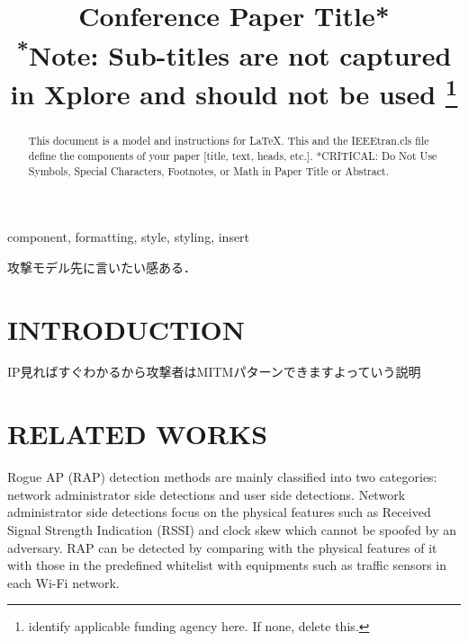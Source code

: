 \documentclass[conference]{IEEEtran}
\begin{document}
\title{Conference Paper Title*\\
{\footnotesize \textsuperscript{*}Note: Sub-titles are not captured in Xplore and
should not be used}
\thanks{identify applicable funding agency here. If none, delete this.}
}

\author{
\and
{}
\and
{}
\and

}

\maketitle

\begin{abstract}
This document is a model and instructions for \LaTeX.
This and the IEEEtran.cls file define the components of your paper [title, text, heads, etc.]. *CRITICAL: Do Not Use Symbols, Special Characters, Footnotes, 
or Math in Paper Title or Abstract.
\end{abstract}

\begin{IEEEkeywords}
component, formatting, style, styling, insert
\end{IEEEkeywords}
 攻撃モデル先に言いたい感ある．
\section{INTRODUCTION}
IP見ればすぐわかるから攻撃者はMITMパターンできますよっていう説明
\section{RELATED WORKS}
Rogue AP (RAP) detection methods are mainly classified into two categories: network administrator side detections and user side detections.
Network administrator side detections focus on the physical features such as Received Signal Strength Indication (RSSI) and clock skew which cannot be spoofed by an adversary.
RAP can be detected by comparing with the physical features of it with those in the predefined whitelist with equipments such as traffic sensors in each Wi-Fi network.
\end{document}
